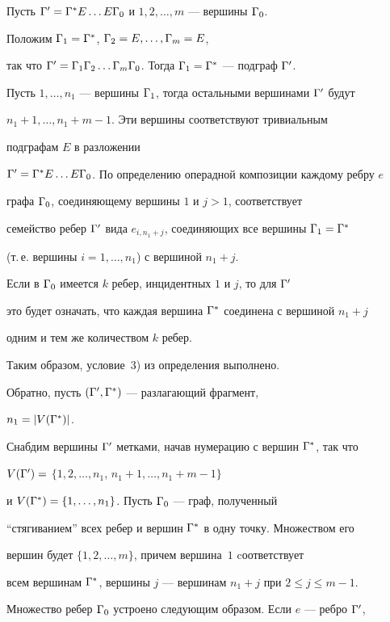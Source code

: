 \begin{pf}


Пусть ${\Gamma}'={\Gamma}^*E\dotsc E{\Gamma}_0$ и $1, 2, \dotsc , m$ --- вершины ${\Gamma}_0$.


Положим ${\Gamma}_1={\Gamma}^*$, ${\Gamma}_2=E, \dotsc ,{\Gamma}_m=E$,


так что ${\Gamma}'={\Gamma}_1{\Gamma}_2\dotsc{\Gamma}_m{\Gamma}_0$. Тогда ${\Gamma}_1={\Gamma}^*$ --- подграф ${\Gamma}'$.


Пусть $1,\dotsc, n_1$ --- вершины ${\Gamma}_1$, тогда остальными вершинами ${\Gamma}'$ будут  


$n_1+1, \dotsc , n_1+m-1$. Эти вершины соответствуют тривиальным 


подграфам $E$ в разложении


${\Gamma}'={\Gamma}^*E\dotsc E{\Gamma}_0$. По определению операдной композиции каждому ребру $e$


графа ${\Gamma}_0$, соединяющему вершины $1$ и $j>1$, соответствует 


семейство ребер ${\Gamma}'$ вида $e_{i, n_1+j}$, соединяющих все вершины ${\Gamma}_1={\Gamma}^*$


(т.\,е. вершины $ i=1, \dotsc ,n_1$) с вершиной $n_1+j$. 


Если в ${\Gamma}_0$ имеется $k$ ребер, инцидентных $1$ и $j$, то для ${\Gamma}'$ 


это будет означать, что каждая вершина ${\Gamma}^*$ соединена с вершиной $n_1+j$ 


одним и тем же количеством $k$ ребер.


Таким образом, условие~3) из определения выполнено.





Обратно, пусть $({\Gamma}', {\Gamma}^*)$ --- разлагающий фрагмент,


$n_1=\vert{ V({\Gamma}^*)\vert}$.


Снабдим вершины ${\Gamma}'$ метками, начав нумерацию с вершин ${\Gamma}^*$, так что 


$V({\Gamma}')=$ $\{ 1, 2, \dotsc ,n_1$, $n_1+1, \dotsc , n_1+m-1\} $ 


и $V({\Gamma}^*)=\{ 1, \dotsc , n_1\}$. Пусть ${\Gamma}_0$ --- граф, полученный 


``стягиванием'' всех ребер и вершин ${\Gamma}^*$ в одну точку. Множеством его 


вершин будет $\{ 1, 2, \dotsc , m\}$, причем вершина~$1$ cоответствует 


всем вершинам ${\Gamma}^*$, вершины $j$ --- вершинам $n_1+j$ при $2\leq j\leq m-1$.


Множество ребер ${\Gamma}_0$ устроено следующим образом. Если $e$ --- ребро ${\Gamma}'$, 



\end{pf}
